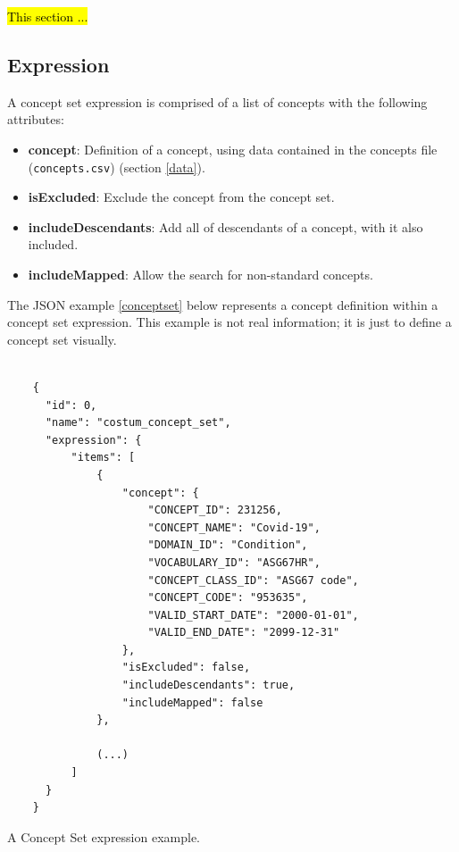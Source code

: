 \hl{This section ...}


\subsection{Expression}
A concept set expression is comprised of a list of concepts with the following attributes:

\begin{itemize}
  \item \textbf{concept}: Definition of a concept, using data contained in the concepts file  {\small\normalfont(\texttt{concepts.csv})} (section \ref{data}).
  \item \textbf{isExcluded}: Exclude the concept from the concept set.
  \item \textbf{includeDescendants}: Add all of descendants of a concept, with it also included.
  \item \textbf{includeMapped}: Allow the search for non-standard concepts.
\end{itemize}


The JSON example \ref{conceptset} below represents a concept definition within a concept set expression. This example is not real information; it is just to define a concept set visually.

\begin{listing}[H]
  \begin{verbatim}
      
    {
      "id": 0,
      "name": "costum_concept_set",
      "expression": {
          "items": [
              {
                  "concept": {
                      "CONCEPT_ID": 231256,
                      "CONCEPT_NAME": "Covid-19",
                      "DOMAIN_ID": "Condition",
                      "VOCABULARY_ID": "ASG67HR",
                      "CONCEPT_CLASS_ID": "ASG67 code",
                      "CONCEPT_CODE": "953635",
                      "VALID_START_DATE": "2000-01-01",
                      "VALID_END_DATE": "2099-12-31"
                  },
                  "isExcluded": false,
                  "includeDescendants": true,
                  "includeMapped": false
              },
              
              (...)
          ]
      }
    }

  \end{verbatim}
\caption{A Concept Set expression example.}
\label{conceptset}
\end{listing}  



